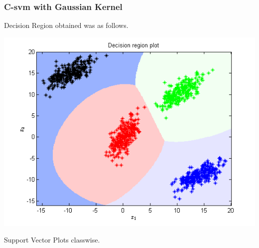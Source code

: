\documentclass{article}
\begin{document}
\subsubsection{C-svm with Gaussian Kernel}
Decision Region obtained was as follows.
\begin{center}
\includegraphics[scale=1]{Classification/1a/c_g/dec}
\end{center}
Support Vector Plots classwise.
\end{document}
